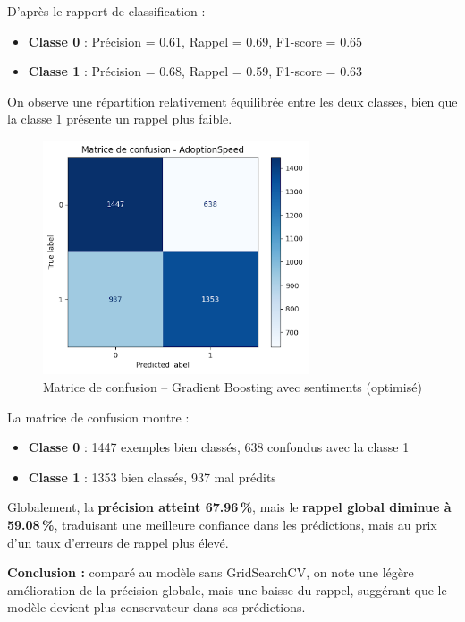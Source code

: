 \documentclass[a4paper,12pt]{article}
\begin{document}
D’après le rapport de classification :
\begin{itemize}
    \item \textbf{Classe 0} : Précision = 0.61, Rappel = 0.69, F1-score = 0.65
    \item \textbf{Classe 1} : Précision = 0.68, Rappel = 0.59, F1-score = 0.63
\end{itemize}

On observe une répartition relativement équilibrée entre les deux classes, bien que la classe 1 présente un rappel plus faible.

\begin{figure}[H]
    \centering
    \includegraphics[width=0.7\textwidth]{matrice_confusion_sentiment_gridsearch.png}
    \caption{Matrice de confusion -- Gradient Boosting avec sentiments (optimisé)}
    \label{fig:matrice_confusion_sentiment_gridsearch}
\end{figure}

La matrice de confusion montre :
\begin{itemize}
    \item \textbf{Classe 0} : 1447 exemples bien classés, 638 confondus avec la classe 1
    \item \textbf{Classe 1} : 1353 bien classés, 937 mal prédits
\end{itemize}

Globalement, la \textbf{précision atteint 67.96\,\%}, mais le \textbf{rappel global diminue à 59.08\,\%}, traduisant une meilleure confiance dans les prédictions, mais au prix d’un taux d’erreurs de rappel plus élevé.

\vspace{0.5em}
\textbf{Conclusion :} comparé au modèle sans GridSearchCV, on note une légère amélioration de la précision globale, mais une baisse du rappel, suggérant que le modèle devient plus conservateur dans ses prédictions.
\end{document}
